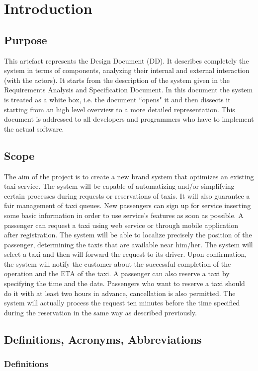 \section{Introduction}
\subsection{Purpose}
This artefact represents the Design Document (DD). It describes completely the system in terms of components, analyzing their internal and external interaction (with the actors). It starts from the description of the system given in the Requirements Analysis and Specification Document. In this document the system is treated as a white box, i.e. the document ``opens" it and then dissects it starting from an high level overview to a more detailed representation. This document is addressed to all developers and programmers who have to implement the actual software.
\subsection{Scope}
The aim of the project is to create a new brand system that optimizes an 
existing taxi service.
The system will be capable of automatizing  and/or simplifying certain 
processes during requests or reservations of taxis.
It will also guarantee a fair management of taxi queues.
New passengers can sign up for service inserting some basic information in order to use service's features as soon as possible.
A passenger can request a taxi using web service or through mobile
application after registration. The system will be able to localize precisely the position
of the passenger, determining the taxis that are available near
him/her. The system will select a taxi and then will forward the request to its driver.
Upon confirmation, the system will notify the customer about the successful completion of the operation and the ETA of the taxi. A passenger can also reserve a taxi by specifying the time and the date.
Passengers who want to reserve a taxi should do it with at least two hours in advance, cancellation is also permitted. The system will actually process the request ten minutes before the time specified during the reservation in the same way as described previously.
\subsection{Definitions, Acronyms, Abbreviations}
\subsubsection{Definitions}
